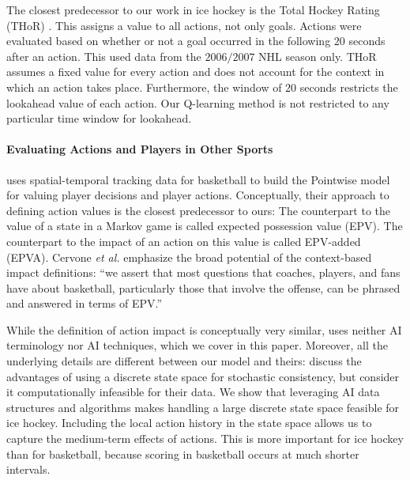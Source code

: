 \documentclass[]{article}
\begin{document}
The closest predecessor to our work in ice hockey is the Total Hockey Rating (THoR) \citep{Schuckers2013}. This assigns a value to all actions, not only goals. Actions were evaluated based on whether or not a goal occurred in the following $20$ seconds after an action. %
This used data from the $2006/2007$ NHL season only. THoR assumes a fixed value for every action and does not account for the context in which an action takes place. Furthermore, the window of $20$ seconds restricts the lookahead value of each action. Our Q-learning method is not restricted to any particular time window for lookahead.

\paragraph{Evaluating Actions and Players in Other Sports}
\citep{Cervone2014a} uses spatial-temporal tracking data for basketball to build the {\sc Pointwise} model for valuing player decisions and player actions. Conceptually, their approach to defining action values is the closest predecessor to ours: The counterpart to the value of a state in a Markov game is called expected possession value (EPV). The counterpart to the impact of an action on this value is called EPV-added (EPVA). Cervone {\em et al.} emphasize the broad potential of the context-based impact definitions: ``we assert that most questions that coaches, players, and fans have about basketball, particularly those that involve the offense, can be phrased and answered in terms of EPV.''

While the definition of action impact is conceptually very similar, \citep{Cervone2014a} uses neither AI terminology nor AI techniques, which we cover in this paper. Moreover, all the underlying details are different between our model and theirs:
\citep{Cervone2014a} discuss the advantages of using a discrete state space for stochastic consistency, but consider it computationally infeasible for their data.
We show that leveraging AI data structures and algorithms makes handling a large discrete state space feasible for ice hockey.
Including the local action history in the state space allows us to capture the medium-term effects of actions.
This is more important for ice hockey than for basketball, because scoring in basketball occurs at much shorter intervals.
\end{document}
